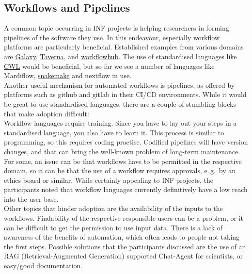 \documentclass{eceasst}
\newcommand{\eg}{e.\,g.}
\begin{document}
\subsection{Workflows and Pipelines}
A common topic occurring in INF projects is helping researchers in forming pipelines of the software they use.
In this endeavour, especially workflow platforms are particularly beneficial.
Established examples from various domains are \href{https://galaxyproject.github.io/}{Galaxy}, \href{https://esciencelab.org.uk/products/taverna/}{Taverna}, and \href{https://workflowhub.eu/}{workflowhub}.
The use of standardised languages like \href{https://www.commonwl.org/}{CWL} would be beneficial, but so far we see a number of languages
like Mardiflow, \href{https://snakemake.readthedocs.io/en/stable/}{snakemake} and nextflow in use.\\
Another useful mechanism for automated workflows is pipelines,
as offered by platforms such as github and gitlab in their CI/CD environments.
While it would be great to use standardised languages, there are a couple of stumbling blocks that make adoption difficult:\\
Workflow languages require training.
Since you have to lay out your steps in a standardised language, you also have to learn it.
This process is similar to programming, so this requires coding practise.
Codified pipelines will have version changes, and that can bring the well-known problem of long-term maintenance.
For some, an issue can be that workflows have to be permitted in the respective domain,
so it can be that the use of a workflow requires approvals, \eg~by an ethics board or similar.
While certainly appealing to INF projects, the participants noted that
workflow languages currently definitively have a low reach into the user base.\\
Other topics that hinder adoption are the availability of the inputs to the workflows.
Findability of the respective responsible users can be a problem, or
it can be difficult to get the permission to use input data.
There is a lack of awareness of the benefits of automation, which often leads to people not taking the first steps.
Possible solutions that the participants discussed are the use of an RAG (Retrieval-Augmented Generation) supported Chat-Agent for scientists,
or easy/good documentation.
\end{document}
